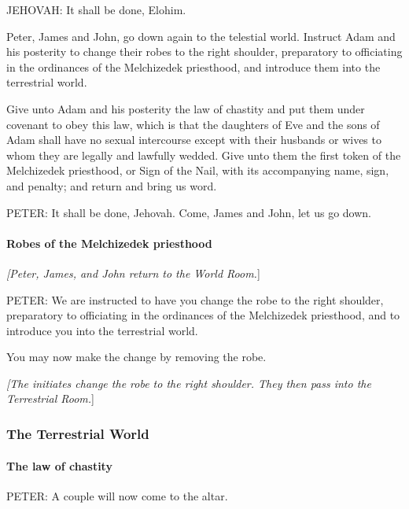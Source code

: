 				JEHOVAH: It shall be done, Elohim.

				Peter, James and John, go down again to the telestial world. Instruct Adam and his posterity to change their robes to the right shoulder, preparatory to officiating in the ordinances of the Melchizedek priesthood, and introduce them into the terrestrial world.

				Give unto Adam and his posterity the law of chastity and put them under covenant to obey this law, which is that the daughters of Eve and the sons of Adam shall have no sexual intercourse except with their husbands or wives to whom they are legally and lawfully wedded. Give unto them the first token of the Melchizedek priesthood, or Sign of the Nail, with its accompanying name, sign, and penalty; and return and bring us word.

				PETER: It shall be done, Jehovah. Come, James and John, let us go down.
				
			\paragraph{Robes of the Melchizedek priesthood}
				\label{TEMPLE-ENDOWMENT-ENDOW-PRE-1990-ROBES-MELCHIZEDEK}
				
				\textit{[Peter, James, and John return to the World Room.}]

				PETER: We are instructed to have you change the robe to the right shoulder, preparatory to officiating in the ordinances of the Melchizedek priesthood, and to introduce you into the terrestrial world.

				You may now make the change by removing the robe.

				\textit{[The initiates change the robe to the right shoulder. They then pass into the Terrestrial Room.}]
		\subsubsection{The Terrestrial World}
			\label{TEMPLE-ENDOWMENT-ENDOW-PRE-1990-TERRESTRIAL}
			
			\paragraph{The law of chastity}
				\label{TEMPLE-ENDOWMENT-ENDOW-PRE-1990-CHASTITY}
				
				PETER: A couple will now come to the altar.

